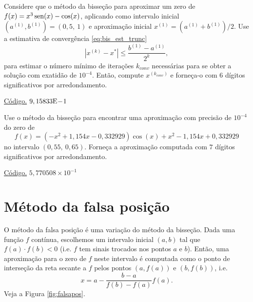 \begin{exer}\label{exer:bis_est_trunc}
  Considere que o método da bisseção para aproximar um zero de $f(x)=x^3\operatorname{sen}(x)-\cos(x)$, aplicando como intervalo inicial $(a^{(1)}, b^{(1)}) = (0,5, ~1)$ e aproximação inicial $x^{(1)}=(a^{(1)}+b^{(1)})/2$. Use a estimativa de convergência \eqref{eq:bis_est_trunc}
  \begin{equation}
    \left|x^{(k)} - x^{*}\right| \leq \frac{b^{(1)}-a^{(1)}}{2^k},
  \end{equation}
para estimar o número mínimo de iterações $k_{conv}$ necessárias para se obter a solução com exatidão de $10^{-4}$. Então, compute $x^{(k_{conv})}$ e forneça-o com $6$ dígitos significativos por arredondamento.
\end{exer}
\begin{resp}
    \ifisoctave 
  \href{https://github.com/phkonzen/notas/blob/master/src/MatematicaNumerica/cap_eq1d/dados/exer_bis_este_trunc/exer_bis_est_trunc.m}{Código.} 
  \fi
  $9,15833\mathrm{E}\!-\!1$
\end{resp}

\begin{exer}\label{exer:bis_multpar}
  Use o método da bisseção para encontrar uma aproximação com precisão de $10^{-4}$ do zero de
  \begin{equation}
    f(x) = (-x^2+1,154x-0,332929)\cos(x) + x^2 - 1,154x + 0,332929
  \end{equation}
no intervalo $(0,55, ~0,65)$. Forneça a aproximação computada com $7$ dígitos significativos por arredondamento.
\end{exer}
\begin{resp}
    \ifisoctave 
  \href{https://github.com/phkonzen/notas/blob/master/src/MatematicaNumerica/cap_eq1d/dados/exer_bis_multpar/exer_bis_multpar.m}{Código.} 
  \fi
  $5,770508\times 10^{-1}$
\end{resp}

\section{Método da falsa posição}\label{cap_eq1d_sec_falsapos}

O método da falsa posição é uma variação do método da bisseção. Dada uma função $f$ contínua, escolhemos um intervalo inicial $(a, b)$ tal que $f(a)\cdot f(b) < 0$ (i.e. $f$ tem sinais trocados nos pontos $a$ e $b$). Então, uma aproximação para o zero de $f$ neste intervalo é computada como o ponto de interseção da reta secante a $f$ pelos pontos $(a, f(a))$ e $(b, f(b))$, i.e.
\begin{equation}
  x = a - \frac{b-a}{f(b)-f(a)}f(a).
\end{equation}
Veja a Figura \ref{fig:falsapos}.

